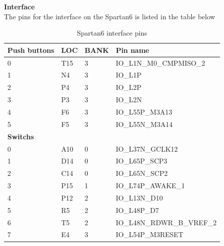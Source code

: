 \textbf{Interface}\\
The pins for the interface on the Spartan6 is listed in the table below
\begin{table}[H]
    \begin{tabular}{|p{3cm}|p{3cm}|p{3cm}|p{5cm}|}
        \hline
        \textbf{Push buttons} & \textbf{LOC} & \textbf{BANK} & \textbf{Pin name}     \\ \hline
        0                     & T15          & 3             & IO\_L1N\_M0\_CMPMISO\_2   \\ \hline
        1                     & N4           & 3             & IO\_L1P                \\ \hline
        2                     & P4           & 3             & IO\_L2P                \\ \hline
        3                     & P3           & 3             & IO\_L2N                \\ \hline
        4                     & F6           & 3             & IO\_L55P\_M3A13         \\ \hline
        5                     & F5           & 3             & IO\_L55N\_M3A14         \\ \hline
        \textbf{Switchs}      & ~            & ~             & ~                     \\ \hline
        0                     & A10          & 0             & IO\_L37N\_GCLK12        \\ \hline
        1                     & D14          & 0             & IO\_L65P\_SCP3          \\ \hline
        2                     & C14          & 0             & IO\_L65N\_SCP2          \\ \hline
        3                     & P15          & 1             & IO\_L74P\_AWAKE\_1       \\ \hline
        4                     & P12          & 2             & IO\_L13N\_D10           \\ \hline
        5                     & R5           & 2             & IO\_L48P\_D7            \\ \hline
        6                     & T5           & 2             & IO\_L48N\_RDWR\_B\_VREF\_2 \\ \hline
        7                     & E4           & 3             & IO\_L54P\_M3RESET       \\
        \hline
    \end{tabular}
    \caption{Spartan6 interface pins}
\end{table}


